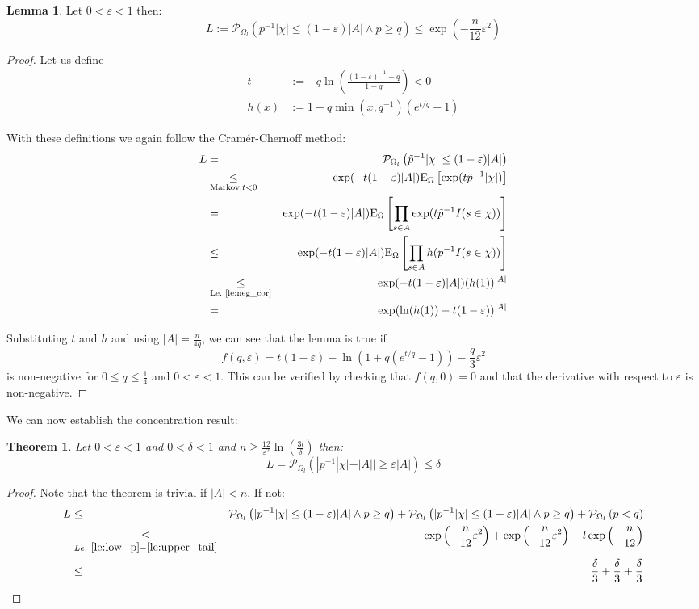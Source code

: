 \documentclass{article}
\newcommand{\prob}{\mathcal P}
\newcommand{\expectation}{\mathrm{E}}
\newcommand{\eps}{\varepsilon}
\newtheorem{theorem}{Theorem}
\theoremstyle{definition}
\newtheorem{lemma}{Lemma}
\begin{document}
\begin{lemma}\label{le:lower_tail}
Let $0 < \eps < 1$ then:
\[
  L := \prob_{\Omega_l} ( p^{-1} |\chi| \leq (1-\eps)|A| \wedge p \geq q) \leq \exp\left(-\frac{n}{12} \eps^2\right)
\]
\end{lemma}
\begin{proof}
Let us define
\begin{align*}
  t & := - q \ln\left( \frac{(1-\eps)^{-1}-q}{1-q}\right) < 0 \\
  h(x) & := 1+q \min(x,q^{-1}) (e^{t/q}-1)  
\end{align*}

With these definitions we again follow the Cram\'{e}r-Chernoff method:
{\allowdisplaybreaks
\begin{eqnarray*}
  L & = & \prob_{\Omega_l} \left( \tilde{p}^{-1} |\chi| \leq (1-\eps)|A| \right) \\
    & \underset{\textrm{Markov,}t<0}{\leq} & \exp( -t (1-\eps) |A| ) \expectation_\Omega \left[ \exp ( t \tilde{p}^{-1} |\chi| ) \right] \\
    & = & \exp( -t (1-\eps) |A| ) \expectation_\Omega \left[ \prod_{s \in A} \exp ( t \tilde{p}^{-1} I(s \in \chi) ) \right] \\
    & \leq & \exp( -t (1-\eps) |A| ) \expectation_\Omega \left[ \prod_{s \in A} h( p^{-1} I(s \in \chi) ) \right] \\
    & \underset{\textrm{Le.~\ref{le:neg_cor}}}{\leq} & \exp( -t (1-\eps) |A| ) (h(1))^{|A|} \\
    & = & \exp( \ln(h(1)) -t (1-\eps) )^{|A|}
\end{eqnarray*}
}

Substituting $t$ and $h$ and using $|A| = \frac{n}{4q}$, we can see that the lemma is true if
\[
  f(q,\eps) = t (1-\eps) - \ln(1+q(e^{t/q}-1)) - \frac{q}{3} \eps^2
\]
is non-negative for $0 \leq q \leq \frac{1}{4}$ and $0 < \eps < 1$.
This can be verified by checking that $f(q,0) = 0$ and that the derivative with respect to $\eps$ is non-negative.
\end{proof}
We can now establish the concentration result:
\begin{theorem}
Let $0 < \eps < 1$ and $0 < \delta < 1$ and $n \geq \frac{12}{\eps^2} \ln\left(\frac{3l}{\delta}\right)$ then:
\[
  L = \prob_{\Omega_l} \left( | p^{-1} |\chi| - |A| | \geq \eps |A| \right) \leq \delta
\]
\end{theorem}
\begin{proof}
Note that the theorem is trivial if $|A| < n$. If not:
\begin{eqnarray*}
  L & \leq & \prob_{\Omega_l} \left( | p^{-1} |\chi| \leq (1-\eps) |A| \wedge p \geq q \right) +
    \prob_{\Omega_l} \left( | p^{-1} |\chi| \leq (1+\eps) |A| \wedge p \geq q \right) +
    \prob_{\Omega_l} \left( p < q \right) \\
    & \underset{Le.~\ref{le:low_p}-\ref{le:upper_tail}}{\leq} &
    \exp\left( - \frac{n}{12} \eps^2 \right)  + \exp\left( - \frac{n}{12} \eps^2 \right) + l \exp\left( - \frac{n}{12} \right) \\
    & \leq & \frac{\delta}{3} + \frac{\delta}{3} + \frac{\delta}{3}
\end{eqnarray*}
\end{proof}
\end{document}
